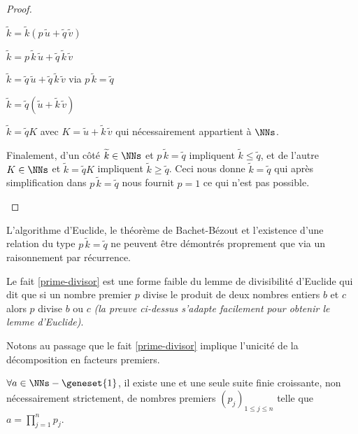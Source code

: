 \begin{proof}
\begin{itemize}[label=\small\textbullet]
		\smallskip
		\noindent
		$\widetilde{k} = \widetilde{k} (p \, \widetilde{u} + \widetilde{q} \, \widetilde{v})$
		
		\smallskip
		\noindent
		$\widetilde{k} = p \, \widetilde{k} \, \widetilde{u} + \widetilde{q} \, \widetilde{k} \, \widetilde{v}$
		
		\smallskip
		\noindent
		$\widetilde{k} = \widetilde{q} \, \widetilde{u} + \widetilde{q} \, \widetilde{k} \, \widetilde{v}$ via $p \, \widetilde{k} = \widetilde{q}$
		
		\smallskip
		\noindent
		$\widetilde{k} = \widetilde{q} (\widetilde{u} + \widetilde{k} \, \widetilde{v})$
		
		\smallskip
		\noindent
		$\widetilde{k} = \widetilde{q} K$ avec $K = \widetilde{u} + \widetilde{k} \, \widetilde{v}$ qui nécessairement appartient à $\NNs$.
		
		\smallskip
		\noindent
		Finalement,
		d'un côté $\widetilde{k} \in \NNs$ et $p \, \widetilde{k} = \widetilde{q}$ impliquent $\widetilde{k} \leq \widetilde{q}$,
		et de l'autre $K \in \NNs$ et $\widetilde{k} = \widetilde{q} K$ impliquent $\widetilde{k} \geq \widetilde{q}$.
		Ceci nous donne $\widetilde{k} = \widetilde{q}$ qui après simplification dans $p \, \widetilde{k} = \widetilde{q}$ nous fournit $p = 1$ ce qui n'est pas possible.
	\end{itemize}
\end{proof}


\begin{unproved}
	L'algorithme d'Euclide, le théorème de Bachet-Bézout et l'existence d'une relation du type $p \, \widetilde{k} = \widetilde{q}$ ne peuvent être démontrés proprement que via un raisonnement par récurrence.

\end{unproved}


\begin{remark}
	Le fait \ref{prime-divisor} est une forme faible du lemme de divisibilité d'Euclide qui dit que si un nombre premier $p$ divise le produit de deux nombres entiers $b$ et $c$ alors $p$ divise $b$ ou $c$ \emph{(la preuve ci-dessus s'adapte facilement pour obtenir le lemme d'Euclide)}.  
\end{remark}


Notons au passage que le fait \ref{prime-divisor} implique l'unicité de la décomposition en facteurs premiers.

\begin{fact} \label{prime-decompo}
	$\forall a \in \NNs - \geneset{1}$, il existe une et une seule suite finie croissante, non nécessairement strictement, de nombres premiers $(p_j)_{1 \leq j \leq n}$
	telle que $\displaystyle a = \prod_{j=1}^{n} p_j$. 
\end{fact}
	

